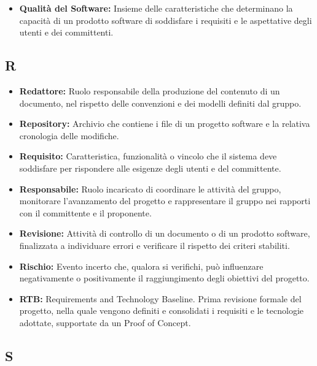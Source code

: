 \begin{itemize}
    \item \textbf{Qualità del Software:} Insieme delle caratteristiche che determinano la capacità di un prodotto software di soddisfare i requisiti e le aspettative degli utenti e dei committenti.
\end{itemize}


{}
\subsection*{R}

\begin{itemize}
    \item \textbf{Redattore:} Ruolo responsabile della produzione del contenuto di un documento, nel rispetto delle convenzioni e dei modelli definiti dal gruppo.
    \item \textbf{Repository:} Archivio che contiene i file di un progetto software e la relativa cronologia delle modifiche.
    \item \textbf{Requisito:} Caratteristica, funzionalità o vincolo che il sistema deve soddisfare per rispondere alle esigenze degli utenti e del committente.
    \item \textbf{Responsabile:} Ruolo incaricato di coordinare le attività del gruppo, monitorare l'avanzamento del progetto e rappresentare il gruppo nei rapporti con il committente e il proponente.
    \item \textbf{Revisione:} Attività di controllo di un documento o di un prodotto software, finalizzata a individuare errori e verificare il rispetto dei criteri stabiliti.
    \item \textbf{Rischio:} Evento incerto che, qualora si verifichi, può influenzare negativamente o positivamente il raggiungimento degli obiettivi del progetto.
    \item \textbf{RTB:} Requirements and Technology Baseline. Prima revisione formale del progetto, nella quale vengono definiti e consolidati i requisiti e le tecnologie adottate, supportate da un Proof of Concept.
\end{itemize}


{}
\subsection*{S}

